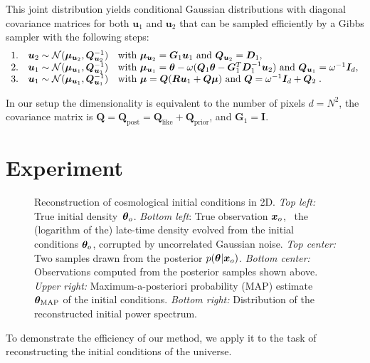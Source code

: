 This joint distribution yields conditional Gaussian distributions with diagonal covariance matrices for both $\bm u_1$ and $\bm u_2$ that can be sampled efficiently by a Gibbs sampler with the following steps:
\begin{equation}
\begin{array}{ccl}
    1. & \bm u_2\sim\mathcal{N}(\bm \mu_{\bm u_2}, \bm Q^{-1}_{\bm u_2}) & \text{with } \bm \mu_{\bm u_2} = \bm G_1 \bm u_1 \text{ and }\bm Q_{\boldsymbol u_2} = \boldsymbol D_1, \\
    2.  & \bm u_1\sim\mathcal{N}(\bm \mu_{\bm u_1}, \bm Q^{-1}_{\bm u_1})  & \text{with } \bm \mu_{\bm u_1} = \bm{\theta} - \omega(\bm Q_1 \bm{\theta} - \bm G_1^T \bm D_1^{-1} \bm u_2) \text{ and } \bm Q_{\bm u_1} = \omega^{-1} \bm I_d, \\
    3.  & \bm u_1\sim\mathcal{N}(\bm \mu_{\bm u_1}, \bm Q^{-1}_{\bm u_1}) & \text{with }\bm \mu = \bm Q(\bm R \bm  u_1 + \bm  Q \bm \mu) \text{ and } \bm Q = \omega^{-1} \bm I_d + \bm Q_2 \;.
\end{array}
\end{equation}

In our setup the dimensionality is equivalent to the number of pixels $d=N^2$, the covariance matrix is $\bm Q = \bm Q_{\text{post}} = \bm Q_{\text{like}} + \bm Q_{\text{prior}}$, and $\bm G_1= \bm I$.


\section{Experiment} \label{sec:cosmo-exp}
\begin{sidewaysfigure}
    \centering
    \caption{Reconstruction of cosmological initial conditions in 2D. {\it Top left:} True initial density~${\bm{\theta}}_o$. {\it Bottom left}: True observation ${\bm{x}}_o$, \ie\ the (logarithm of the) late-time density evolved from the initial conditions ${\bm{\theta}}_o$, corrupted by uncorrelated Gaussian noise. {\it Top center:} Two samples drawn from the posterior $p(\bm{\theta} | \bm {\bm{x}}_o)$. {\it Bottom center:} Observations computed from the posterior samples shown above. {\it Upper right:} Maximum-a-posteriori probability (MAP) estimate ${\bm{\theta}}_{\text{MAP}}$ of the initial conditions. {\it Bottom right:} Distribution of the reconstructed initial power spectrum.}
    \label{fig:results}
\end{sidewaysfigure} 

To demonstrate the efficiency of our method, we apply it to the task of reconstructing the initial conditions of the universe. 

